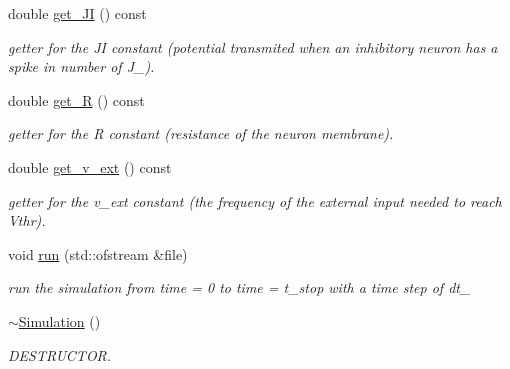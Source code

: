 \begin{DoxyCompactItemize}
double \hyperlink{classSimulation_a1c84ccf7781a28dacfc0445a5fbcf27e}{get\-\_\-\-J\-I} () const 
\begin{DoxyCompactList}\small\item\em getter for the J\-I constant (potential transmited when an inhibitory neuron has a spike in number of J\-\_\-). \end{DoxyCompactList}\item 
double \hyperlink{classSimulation_a529087d8afb97b985c74fcdeb7a8329f}{get\-\_\-\-R} () const 
\begin{DoxyCompactList}\small\item\em getter for the R constant (resistance of the neuron membrane). \end{DoxyCompactList}\item 
double \hyperlink{classSimulation_a3a991511c975376cb57804c5db8acb21}{get\-\_\-v\-\_\-ext} () const 
\begin{DoxyCompactList}\small\item\em getter for the v\-\_\-ext constant (the frequency of the external input needed to reach Vthr). \end{DoxyCompactList}\item 
void \hyperlink{classSimulation_a92bcb99c5b442ef67d0229ae922a6240}{run} (std\-::ofstream \&file)
\begin{DoxyCompactList}\small\item\em run the simulation from time = 0 to time = t\-\_\-stop with a time step of dt\-\_\- \end{DoxyCompactList}\item 
\hypertarget{classSimulation_a80fad3f57dfaf195a36f7bc49bc88279}{\hyperlink{classSimulation_a80fad3f57dfaf195a36f7bc49bc88279}{$\sim$\-Simulation} ()}\label{classSimulation_a80fad3f57dfaf195a36f7bc49bc88279}

\begin{DoxyCompactList}\small\item\em D\-E\-S\-T\-R\-U\-C\-T\-O\-R. \end{DoxyCompactList}\end{DoxyCompactItemize}


